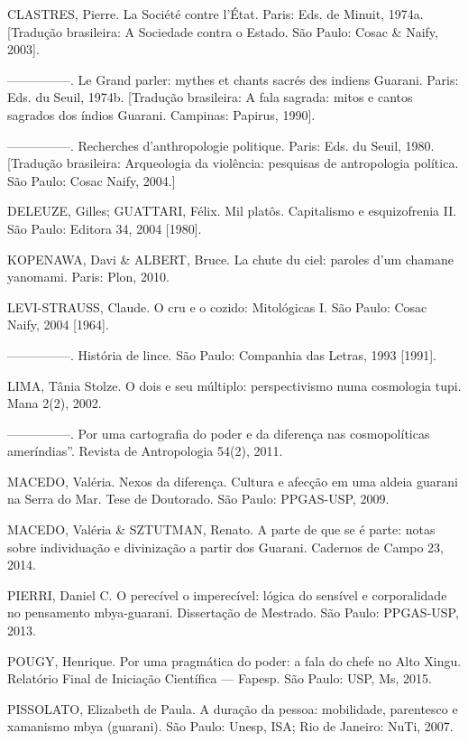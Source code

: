 \documentclass{article}
\begin{document}
CLASTRES, Pierre. La Soci\'et\'e contre l{\textquoteright}\'Etat. Paris:
Eds. de Minuit, 1974a. [Tradu\c{c}\~ao brasileira: A Sociedade contra o
Estado. S\~ao Paulo: Cosac \& Naify, 2003].

{}---{}---{}---{}---{}---. Le Grand parler: mythes et chants sacr\'es
des indiens Guarani. Paris: Eds. du Seuil, 1974b. [Tradu\c{c}\~ao
brasileira: A fala sagrada: mitos e cantos sagrados dos \'indios
Guarani. Campinas: Papirus, 1990]. 

{}---{}---{}---{}---{}---. Recherches d{\textquoteright}anthropologie
politique. Paris: Eds. du Seuil, 1980. [Tradu\c{c}\~ao brasileira:
Arqueologia da viol\^encia: pesquisas de antropologia pol\'itica. S\~ao
Paulo: Cosac Naify, 2004.] 

DELEUZE, Gilles; GUATTARI, F\'elix. Mil plat\^os. Capitalismo e
esquizofrenia II. S\~ao Paulo: Editora 34, 2004 [1980].

KOPENAWA, Davi \& ALBERT, Bruce. La chute du ciel: paroles
d{\textquoteright}um chamane yanomami. Paris: Plon, 2010.

LEVI-STRAUSS, Claude. O cru e o cozido: Mitol\'ogicas I. S\~ao Paulo:
Cosac Naify, 2004 [1964].

{}---{}---{}---{}---{}---. Hist\'oria de lince. S\~ao Paulo: Companhia
das Letras, 1993 [1991]. 

LIMA, T\^ania Stolze. O dois e seu m\'ultiplo: perspectivismo numa
cosmologia tupi. Mana 2(2), 2002.

{}---{}---{}---{}---{}---. Por uma cartografia do poder e da
diferen\c{c}a nas cosmopol\'iticas amer\'indias{\textquotedblright}.
Revista de Antropologia 54(2), 2011. 

MACEDO, Val\'eria. Nexos da diferen\c{c}a. Cultura e afec\c{c}\~ao em
uma aldeia guarani na Serra do Mar. Tese de Doutorado. S\~ao Paulo:
PPGAS-USP, 2009.

MACEDO, Val\'eria \& SZTUTMAN, Renato. A parte de que se \'e parte:
notas sobre individua\c{c}\~ao e diviniza\c{c}\~ao a partir dos
Guarani. Cadernos de Campo 23, 2014.

PIERRI, Daniel C. O perec\'ivel o imperec\'ivel: l\'ogica do sens\'ivel
e corporalidade no pensamento mbya-guarani. Disserta\c{c}\~ao de
Mestrado. S\~ao Paulo: PPGAS-USP, 2013.

POUGY, Henrique. Por uma pragm\'atica do poder: a fala do chefe no Alto
Xingu. Relat\'orio Final de Inicia\c{c}\~ao Cient\'ifica --- Fapesp.
S\~ao Paulo: USP, Ms, 2015. 

PISSOLATO, Elizabeth de Paula. A dura\c{c}\~ao da pessoa: mobilidade,
parentesco e xamanismo mbya (guarani). S\~ao Paulo: Unesp, ISA; Rio de
Janeiro: NuTi, 2007.
\end{document}
